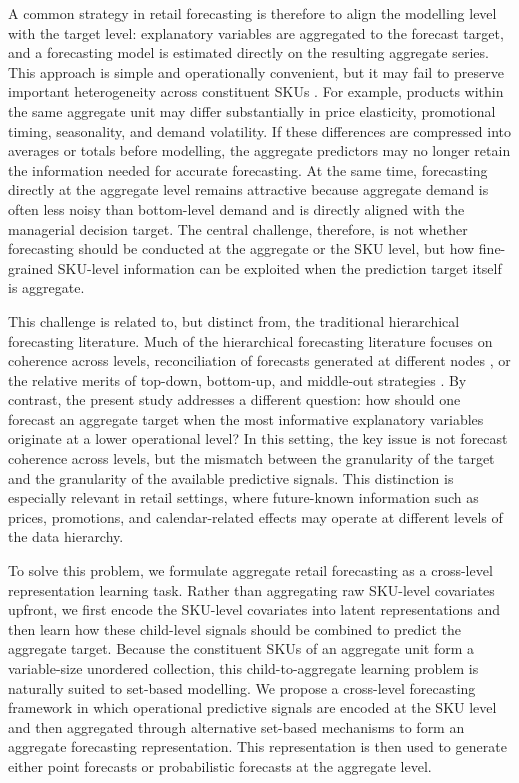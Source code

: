 \documentclass[12pt]{article}
\begin{document}
A common strategy in retail forecasting is therefore to align the modelling level with the target level: explanatory variables are aggregated to the forecast target, and a forecasting model is estimated directly on the resulting aggregate series. This approach is simple and operationally convenient, but it may fail to preserve important heterogeneity across constituent SKUs \parencite{MA2017680}. For example, products within the same aggregate unit may differ substantially in price elasticity, promotional timing, seasonality, and demand volatility. If these differences are compressed into averages or totals before modelling, the aggregate predictors may no longer retain the information needed for accurate forecasting. At the same time, forecasting directly at the aggregate level remains attractive because aggregate demand is often less noisy than bottom-level demand and is directly aligned with the managerial decision target. The central challenge, therefore, is not whether forecasting should be conducted at the aggregate or the SKU level, but how fine-grained SKU-level information can be exploited when the prediction target itself is aggregate.

This challenge is related to, but distinct from, the traditional hierarchical forecasting literature.  Much of the hierarchical forecasting literature focuses on coherence across levels, reconciliation of forecasts generated at different nodes \parencite{HYNDMAN20112579}, or the relative merits of top-down, bottom-up, and middle-out strategies \parencite{ZOTTERI200774}. By contrast, the present study addresses a different question: how should one forecast an aggregate target when the most informative explanatory variables originate at a lower operational level? In this setting, the key issue is not forecast coherence across levels, but the mismatch between the granularity of the target and the granularity of the available predictive signals. This distinction is especially relevant in retail settings, where future-known information such as prices, promotions, and calendar-related effects may operate at different levels of the data hierarchy.

To solve this problem, we formulate aggregate retail forecasting as a cross-level representation learning task. Rather than aggregating raw SKU-level covariates upfront, we first encode the SKU-level covariates into latent representations and then learn how these child-level signals should be combined to predict the aggregate target. Because the constituent SKUs of an aggregate unit form a variable-size unordered collection, this child-to-aggregate learning problem is naturally suited to set-based modelling. We propose a cross-level forecasting framework in which operational predictive signals are encoded at the SKU level and then aggregated through alternative set-based mechanisms to form an aggregate forecasting representation. This representation is then used to generate either point forecasts or probabilistic forecasts at the aggregate level.
\end{document}
